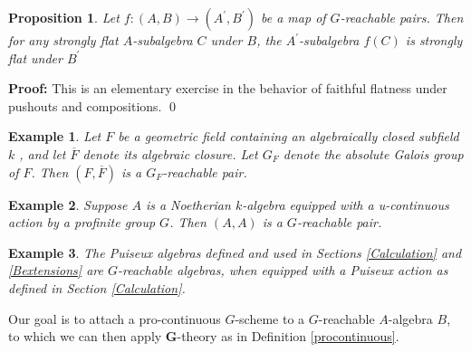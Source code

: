 \documentclass[11pt]{article}
\newcommand\mfk{\mathbf G}
\newtheorem{Proposition}{Proposition}[section]
\newtheorem{Example}{Example}[section]
\newenvironment{Proof}{\par\noindent\textbf{Proof:}}
{\qed}
\begin{document}
        \begin{Proposition}\label{funccriterion} 
Let $f: (A,B)\rightarrow (A^{\prime },B^{\prime}) $ be a map of $G$-reachable pairs.   Then for any strongly flat $A$-subalgebra $C$  under $B$, the $A^{\prime}$-subalgebra $f(C) $ is strongly flat under $B^{\prime} $
  
\end{Proposition}
\begin{Proof}
   This is an elementary exercise in the behavior of faithful flatness under pushouts and compositions. \end{Proof}

   \begin{Example}
    Let $F$ be a geometric field containing an algebraically closed subfield $k$ , and let $\overline{F}$ denote its algebraic closure.  Let $G_F$ denote the absolute Galois group of $F$.  Then $(F, \overline{F})$ is a $G_F$-reachable pair.  
\end{Example}
\begin{Example}
    Suppose $A$ is a Noetherian $k$-algebra equipped with a u-continuous action by a profinite group $G$.  Then $(A,A) $ is a $G$-reachable pair. 
\end{Example}
\begin{Example} The Puiseux algebras defined and used in  Sections  \ref{Calculation} and \ref{Bextensions} are $G$-reachable algebras, when equipped with a Puiseux action as defined in Section \ref{Calculation}.  
\end{Example} 

Our goal is to attach  a pro-continuous $G$-scheme to a $G$-reachable $A$-algebra $B$, to which we can then apply $\mfk$-theory as in Definition \ref{procontinuous}. 
\end{document}
